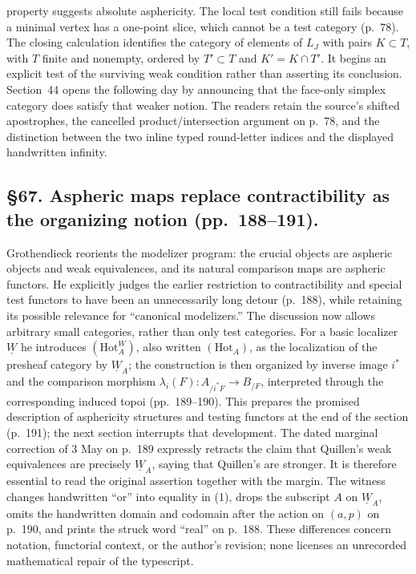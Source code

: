 \documentclass[10pt,oneside]{book}
\begin{document}
property suggests absolute asphericity. The local test condition still fails because a minimal vertex has a one-point slice, which cannot be a test category (p.~78). The closing calculation identifies the category of elements of $L_J$ with pairs $K\subset T$, with $T$ finite and nonempty, ordered by $T'\subset T$ and $K'=K\cap T'$. It begins an explicit test of the surviving weak condition rather than asserting its conclusion. Section~44 opens the following day by announcing that the face-only simplex category does satisfy that weaker notion. The readers retain the source's shifted apostrophes, the cancelled product/intersection argument on p.~78, and the distinction between the two inline typed round-letter indices and the displayed handwritten infinity.

\subsection*{\S67. Aspheric maps replace contractibility as the organizing notion (pp.\ 188--191).}
Grothendieck reorients the modelizer program: the crucial objects are aspheric objects and weak equivalences, and its natural comparison maps are aspheric functors. He explicitly judges the earlier restriction to contractibility and special test functors to have been an unnecessarily long detour (p.\ 188), while retaining its possible relevance for ``canonical modelizers.'' The discussion now allows arbitrary small categories, rather than only test categories. For a basic localizer $\underline W$ he introduces $(\mathrm{Hot}^{W}_{A})$, also written $(\mathrm{Hot}_{A})$, as the localization of the presheaf category by $\underline W_A$; the construction is then organized by inverse image $i^*$ and the comparison morphism $\lambda_i(F):A_{/i^*F}\longrightarrow B_{/F}$, interpreted through the corresponding induced topoi (pp.\ 189--190). This prepares the promised description of asphericity structures and testing functors at the end of the section (p.\ 191); the next section interrupts that development. The dated marginal correction of 3 May on p.\ 189 expressly retracts the claim that Quillen's weak equivalences are precisely $\underline W_A$, saying that Quillen's are stronger. It is therefore essential to read the original assertion together with the margin. The witness changes handwritten ``or'' into equality in (1), drops the subscript $A$ on $\underline W_A$, omits the handwritten domain and codomain after the action on $(a,p)$ on p.\ 190, and prints the struck word ``real'' on p.\ 188. These differences concern notation, functorial context, or the author's revision; none licenses an unrecorded mathematical repair of the typescript.
\end{document}
